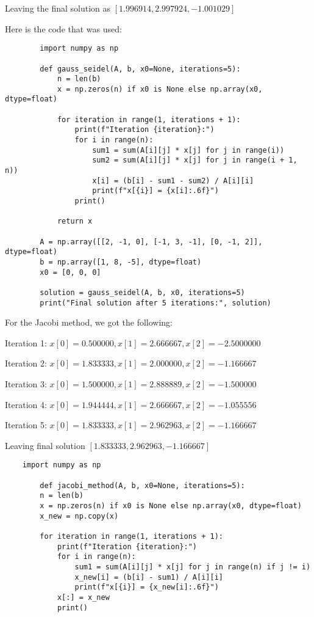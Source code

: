 \documentclass[12pt]{article}
\begin{document}
\begin{enumerate}[leftmargin=0em]
    Leaving the final solution as $[1.996914, 2.997924, -1.001029]$

    Here is the code that was used: 
    \begin{lstlisting}
        import numpy as np

        def gauss_seidel(A, b, x0=None, iterations=5):
            n = len(b)
            x = np.zeros(n) if x0 is None else np.array(x0, dtype=float)
            
            for iteration in range(1, iterations + 1):
                print(f"Iteration {iteration}:")
                for i in range(n):
                    sum1 = sum(A[i][j] * x[j] for j in range(i))
                    sum2 = sum(A[i][j] * x[j] for j in range(i + 1, n))
                    x[i] = (b[i] - sum1 - sum2) / A[i][i]
                    print(f"x[{i}] = {x[i]:.6f}")
                print()
            
            return x
            
        A = np.array([[2, -1, 0], [-1, 3, -1], [0, -1, 2]], dtype=float)
        b = np.array([1, 8, -5], dtype=float)
        x0 = [0, 0, 0]
        
        solution = gauss_seidel(A, b, x0, iterations=5)
        print("Final solution after 5 iterations:", solution)
    \end{lstlisting}

    For the Jacobi method, we got the following:


    Iteration 1: $x[0] = 0.500000, x[1] = 2.666667, x[2] = -2.5000000$

    Iteration 2: $x[0] = 1.833333, x[1] = 2.000000, x[2] = -1.166667$

    Iteration 3: $x[0] = 1.500000, x[1] = 2.888889, x[2] = -1.500000$

    Iteration 4: $x[0] = 1.944444, x[1] = 2.666667, x[2] = -1.055556$

    Iteration 5: $x[0] = 1.833333, x[1] = 2.962963, x[2] = -1.166667$

    Leaving final solution $[1.833333, 2.962963, -1.166667]$

    \begin{lstlisting}
    import numpy as np

        def jacobi_method(A, b, x0=None, iterations=5):
        n = len(b)
        x = np.zeros(n) if x0 is None else np.array(x0, dtype=float)
        x_new = np.copy(x)
    
        for iteration in range(1, iterations + 1):
            print(f"Iteration {iteration}:")
            for i in range(n):
                sum1 = sum(A[i][j] * x[j] for j in range(n) if j != i)
                x_new[i] = (b[i] - sum1) / A[i][i]
                print(f"x[{i}] = {x_new[i]:.6f}")
            x[:] = x_new 
            print()
    

\end{lstlisting}
\end{enumerate}
\end{document}
